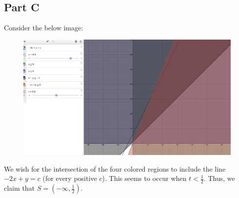 \documentclass[12pt]{article}
\begin{document}
\subsection*{Part C}
Consider the below image:
\begin{figure}[H]
\centering
\includegraphics[width=\textwidth]{desmos2}
\end{figure}
We wish for the intersection of the four colored regions to include the line $-2x+y = c$ (for every positive $c$). This seems to occur when $t < \frac{1}{2}$. Thus, we claim that $S = (-\infty,\frac{1}{2})$.
\newpage
\end{document}
